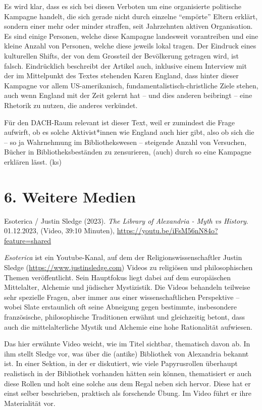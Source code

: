 \documentclass[a4paper,
fontsize=11pt,
oneside,
numbers=noperiodatend,
parskip=half-,
bibliography=totoc,
final
]{scrartcl}
\begin{document}
Es wird klar, dass es sich bei diesen Verboten um eine organisierte
politische Kampagne handelt, die sich gerade nicht durch einzelne
\enquote{empörte} Eltern erklärt, sondern einer mehr oder minder
straffen, seit Jahrzehnten aktiven Organisation. Es sind einige
Personen, welche diese Kampagne landesweit vorantreiben und eine kleine
Anzahl von Personen, welche diese jeweils lokal tragen. Der Eindruck
eines kulturellen Shifts, der von dem Grossteil der Bevölkerung getragen
wird, ist falsch. Eindrücklich beschreibt der Artikel auch, inklusive
einem Interview mit der im Mittelpunkt des Textes stehenden Karen
England, dass hinter dieser Kampagne vor allem US-amerikanisch,
fundamentalistisch-christliche Ziele stehen, auch wenn England mit der
Zeit gelernt hat -- und dies anderen beibringt -- eine Rhetorik zu
nutzen, die anderes verkündet.

Für den DACH-Raum relevant ist dieser Text, weil er zumindest die Frage
aufwirft, ob es solche Aktivist*innen wie England auch hier gibt, also
ob sich die -- so ja Wahrnehmung im Bibliothekswesen -- steigende Anzahl
von Versuchen, Bücher in Bibliotheksbeständen zu zensurieren, (auch)
durch so eine Kampagne erklären lässt. (ks)

\hypertarget{weitere-medien}{%
\section{6. Weitere Medien}\label{weitere-medien}}

Esoterica / Justin Sledge (2023). \emph{The Library of Alexandria - Myth
vs History}. 01.12.2023, (Video, 39:10 Minuten),
\url{https://youtu.be/iFsM56nN84o?feature=shared}

\emph{Esoterica} ist ein Youtube-Kanal, auf dem der
Religionswissenschaftler Justin Sledge
(\url{https://www.justinsledge.com}) Videos zu religiösen und
philosophischen Themen veröffentlicht. Sein Hauptfokus liegt dabei auf
dem europäischen Mittelalter, Alchemie und jüdischer Mystizistik. Die
Videos behandeln teilweise sehr spezielle Fragen, aber immer aus einer
wissenschaftlichen Perspektive -- wobei Slate erstaunlich oft seine
Abneigung gegen bestimmte, insbesondere französische, philosophische
Traditionen erwähnt und gleichzeitig betont, dass auch die
mittelalterliche Mystik und Alchemie eine hohe Rationalität aufwiesen.

Das hier erwähnte Video weicht, wie im Titel sichtbar, thematisch davon
ab. In ihm stellt Sledge vor, was über die (antike) Bibliothek von
Alexandria bekannt ist. In einer Sektion, in der er diskutiert, wie
viele Papyrusrollen überhaupt realistisch in der Bibliothek vorhanden
hätten sein können, thematisiert er auch diese Rollen und holt eine
solche aus dem Regal neben sich hervor. Diese hat er einst selber
beschrieben, praktisch als forschende Übung. Im Video führt er ihre
Materialität vor.
\end{document}
